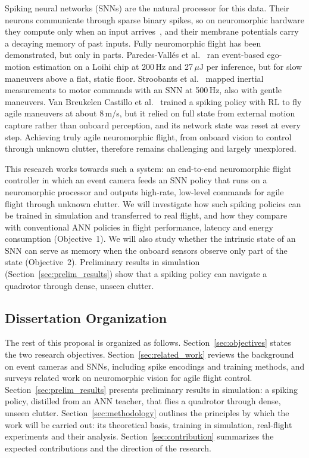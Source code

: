 Spiking neural networks (SNNs) are the natural processor for this data. Their neurons communicate through sparse binary spikes, so on neuromorphic hardware they compute only when an input arrives~\cite{eshraghianTrainingSpikingNeural2023,muirRoadCommercialSuccess2025}, and their membrane potentials carry a decaying memory of past inputs. Fully neuromorphic flight has been demonstrated, but only in parts. Paredes-Vall\'es et al.~\cite{paredes-vallesFullyNeuromorphicVision2023} ran event-based ego-motion estimation on a Loihi chip at 200\,Hz and 27\,$\mu$J per inference, but for slow maneuvers above a flat, static floor. Stroobants et al.~\cite{stroobantsNeuromorphicAttitudeEstimation2025} mapped inertial measurements to motor commands with an SNN at 500\,Hz, also with gentle maneuvers. Van Breukelen Castillo et al.~\cite{vanbreukelencastilloSpikingNeuralNetworks2026} trained a spiking policy with RL to fly agile maneuvers at about 8\,m/s, but it relied on full state from external motion capture rather than onboard perception, and its network state was reset at every step. Achieving truly agile neuromorphic flight, from onboard vision to control through unknown clutter, therefore remains challenging and largely unexplored.

This research works towards such a system: an end-to-end neuromorphic flight controller in which an event camera feeds an SNN policy that runs on a neuromorphic processor and outputs high-rate, low-level commands for agile flight through unknown clutter. We will investigate how such spiking policies can be trained in simulation and transferred to real flight, and how they compare with conventional ANN policies in flight performance, latency and energy consumption (Objective~1). We will also study whether the intrinsic state of an SNN can serve as memory when the onboard sensors observe only part of the state (Objective~2). Preliminary results in simulation (Section~\ref{sec:prelim_results}) show that a spiking policy can navigate a quadrotor through dense, unseen clutter.


\subsection{Dissertation Organization}
The rest of this proposal is organized as follows. Section~\ref{sec:objectives} states the two research objectives. Section~\ref{sec:related_work} reviews the background on event cameras and SNNs, including spike encodings and training methods, and surveys related work on neuromorphic vision for agile flight control. Section~\ref{sec:prelim_results} presents preliminary results in simulation: a spiking policy, distilled from an ANN teacher, that flies a quadrotor through dense, unseen clutter. Section~\ref{sec:methodology} outlines the principles by which the work will be carried out: its theoretical basis, training in simulation, real-flight experiments and their analysis. Section~\ref{sec:contribution} summarizes the expected contributions and the direction of the research.

